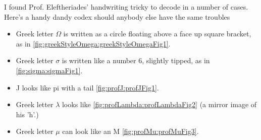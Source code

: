 
I found Prof. Eleftheriades' handwriting tricky to decode in a number of cases.  Here's a handy dandy codex should anybody else have the same troubles

\begin{itemize}
\item 
Greek letter \(\Omega\) is written as a circle floating above a face up square bracket, as in \cref{fig:greekStyleOmega:greekStyleOmegaFig1}.
\item Greek letter \( \sigma \) is written like a number 6, slightly tipped, as in \cref{fig:sigma:sigmaFig1}.  
\item J looks like pi with a tail \cref{fig:profJ:profJFig1}.
\item Greek letter \( \lambda\) looks like \cref{fig:profLambda:profLambdaFig2} (a mirror image of his 'h'.)
\item Greek letter \( \mu\) can look like an M \cref{fig:profMu:profMuFig3}.
\end{itemize}

